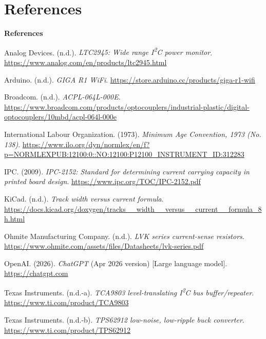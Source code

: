 
\chapter{References}
\label{chap:references}

{}

\begingroup
\renewcommand{\baselinestretch}{2}\normalsize
\setlength{\parindent}{0pt}
\setlength{\parskip}{0pt}
\raggedright
\setlength{\emergencystretch}{3em}

\begin{center}
    \textbf{References}
\end{center}

\newcommand{\apaentry}[1]{%
    \par\noindent\hangindent=0.5in
    #1\par
}

\apaentry{%
    Analog Devices. (n.d.).
    \textit{LTC2945: Wide range I\textsuperscript{2}C power monitor}.
    \url{https://www.analog.com/en/products/ltc2945.html}
}

\apaentry{%
    Arduino. (n.d.).
    \textit{GIGA R1 WiFi}.
    \url{https://store.arduino.cc/products/giga-r1-wifi}
}

\apaentry{%
    Broadcom. (n.d.).
    \textit{ACPL-064L-000E}.
    \url{https://www.broadcom.com/products/optocouplers/industrial-plastic/digital-optocouplers/10mbd/acpl-064l-000e}
}

\apaentry{%
    International Labour Organization. (1973).
    \textit{Minimum Age Convention, 1973 (No. 138)}.
    \url{https://www.ilo.org/dyn/normlex/en/f?p=NORMLEXPUB:12100:0::NO:12100:P12100_INSTRUMENT_ID:312283}
}

\apaentry{%
    IPC. (2009).
    \textit{IPC-2152: Standard for determining current carrying capacity in printed board design}.
    \url{https://www.ipc.org/TOC/IPC-2152.pdf}
}

\apaentry{%
    KiCad. (n.d.).
    \textit{Track width versus current formula}.
    \url{https://docs.kicad.org/doxygen/tracks__width__versus__current__formula_8h.html}
}

\apaentry{%
    Ohmite Manufacturing Company. (n.d.).
    \textit{LVK series current-sense resistors}.
    \url{https://www.ohmite.com/assets/files/Datasheets/lvk-series.pdf}
}

\apaentry{%
    OpenAI. (2026).
    \textit{ChatGPT} (Apr 2026 version) [Large language model].
    \url{https://chatgpt.com}
}

\apaentry{%
    Texas Instruments. (n.d.-a).
    \textit{TCA9803 level-translating I\textsuperscript{2}C bus buffer/repeater}.
    \url{https://www.ti.com/product/TCA9803}
}

\apaentry{%
    Texas Instruments. (n.d.-b).
    \textit{TPS62912 low-noise, low-ripple buck converter}.
    \url{https://www.ti.com/product/TPS62912}
}

\endgroup